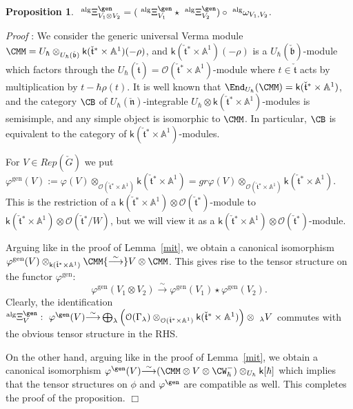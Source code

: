 \documentclass[11pt]{amsart}
\newtheorem{prop}{Proposition}
\theoremstyle{definition}
\theoremstyle{remark}
\renewcommand{\O}{{\mathcal O}}
\theoremstyle{remark}
\newcommand{\cal}{\mathcal}
\newcommand{\iso}{{\stackrel{\sim}{\longrightarrow}}}
\newcommand{\<}{\langle}
\renewcommand{\>}{\rangle}
\newcommand{\Ln}{\check{\mathfrak n}{}}
\newcommand{\Lt}{\check{\mathfrak t}{}}
\newcommand{\Lb}{\check{\mathfrak b}{}}
\newcommand{\LG}{{\check{G}}}
\renewcommand{\O}{{\cal O}}
\newcommand{\Aone}{{\mathbb A}^1}
\newcommand{\kk}{\mathsf k}
\renewcommand{\proof}{{\it Proof }}
\begin{document}
\begin{prop}
\label{tensalg}
$\ ^{\operatorname{alg}}\Xi_{V_1\otimes V_2}^\gen=
(\ ^{\operatorname{alg}}\Xi_{V_1}^\gen\star\ 
^{\operatorname{alg}}\Xi_{V_2}^\gen)
\circ\ ^{\operatorname{alg}}\omega_{V_1,V_2}$.
\end{prop}

\proof: We consider the generic universal Verma module 
$\CMM=U_\hbar\otimes_{U_\hbar(\Lb)}\kk(\Lt^*\times\Aone)(-\rho)$, and
$\kk(\Lt^*\times\Aone)(-\rho)$ is a $U_\hbar(\Lb)$-module which factors
through the $U_\hbar(\Lt)=\O(\Lt^*\times\Aone)$-module where $t\in\Lt$ 
acts by multiplication by $t-\hbar\rho(t)$. It is well known that
$\End_{U_\hbar}(\CMM)=\kk(\Lt^*\times\Aone)$, and the category $\CB$ 
of $U_\hbar(\Ln)$-integrable $U_\hbar\otimes\kk(\Lt^*\times\Aone)$-modules is 
semisimple, and any simple object is isomorphic to $\CMM$. In particular,
$\CB$ is equivalent to the category of 
$\kk(\Lt^*\times\Aone)$-modules. 

For $V\in Rep(\LG)$ we put $\varphi^{\operatorname{gen}}(V):=
\varphi(V)\otimes_{\O(\Lt^*\times\Aone)}\kk(\Lt^*\times\Aone)=
gr\varphi(V)\otimes_{\O(\Lt^*\times\Aone)}\kk(\Lt^*\times\Aone)$.
This is the restriction of a $\kk(\Lt^*\times\Aone)\otimes\O(\Lt^*)$-module
to $\kk(\Lt^*\times\Aone)\otimes\O(\Lt^*/W)$, but we will view it as a
$\kk(\Lt^*\times\Aone)\otimes\O(\Lt^*)$-module.

Arguing like in the proof of Lemma~\ref{mit}, we
obtain a canonical isomorphism 
$\varphi^{\operatorname{gen}}(V)\otimes_{\kk(\Lt^*\times\Aone)}\CMM\iso
V\otimes\CMM$. This gives rise to the tensor structure on the functor
$\varphi^{\operatorname{gen}}$:
$$\varphi^{\operatorname{gen}}(V_1\otimes V_2)\iso
\varphi^{\operatorname{gen}}(V_1)\star\varphi^{\operatorname{gen}}(V_2).$$
Clearly, the identification 
$^{\operatorname{alg}}\Xi_V^\gen:\ \varphi^\gen(V)\iso
\bigoplus_\lambda\left(\O(\Gamma_\lambda)
\otimes_{\O(\Lt^*\times\Aone)}\kk(\Lt^*\times\Aone)\right)\otimes\ 
_\lambda V$ commutes with the obvious tensor structure in the RHS.

On the other hand, arguing like in the proof of Lemma~\ref{mit}, we
obtain a canonical isomorphism $\varphi^\gen(V)\iso
(\CMM\otimes V\otimes \CW^-_\hbar)\otimes_{U_\hbar}\kk[\hbar]$ which 
implies that the tensor structures on $\phi$ and $\varphi^\gen$ are
compatible as well. This completes the proof of the proposition. \hfill $\Box$
\end{document}
